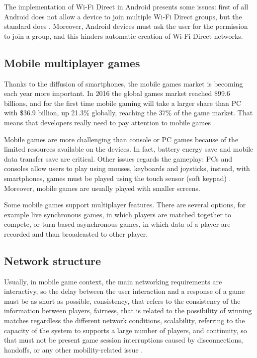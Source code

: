 The implementation of Wi-Fi Direct in Android presents some issues: first of all
Android does not allow a device to join multiple Wi-Fi Direct groups,
but the standard does \cite{bib:android-wifidirect-limits}. Moreover, Android 
devices must ask the user for the permission to join a group, and this hinders 
automatic creation of Wi-Fi Direct networks.

\subsection{Mobile multiplayer games}
Thanks to the diffusion of smartphones, the mobile games market is becoming each 
year more important. In 2016 the global games market reached \$99.6 billions, and 
for the first time mobile gaming will take a larger share than PC with \$36.9 billion, 
up 21.3\% globally, reaching the 37\% of the game market. That means that developers 
really need to pay attention to mobile games \cite{bib:newzoo2}.

Mobile games are more challenging than console or PC games because of the limited 
resources available on the devices. In fact, battery energy save and mobile data 
transfer save are critical. Other issues regards the gameplay: PCs and consoles 
allow users to play using mouses, keyboards and joysticks, instead, with smartphones, 
games must be played using the touch sensor (soft keypad) \cite{bib:mobile-input-devices}. 
Moreover, mobile games are usually played with smaller screens.

Some mobile games support multiplayer features. There are several options, for 
example live synchronous games, in which players are matched together to compete, 
or turn-based asynchronous games, in which data of a player are recorded and than 
broadcasted to other player.

\subsection{Network structure}
Usually, in mobile game context, the main networking requirements are interactivy, so 
the delay between the user interaction and a response of a game must be as short as possible, 
consistency, that refers to the consistency of the information between players, fairness, 
that is related to the possibility of winning matches regardless the different network conditions, 
scalability, referring to the capacity of the system to supports a large number of players, 
and continuity, so that must not be present game session interruptions caused by disconnections, 
handoffs, or any other mobility-related issue \cite{bib:interactive-mobile-gaming}.

